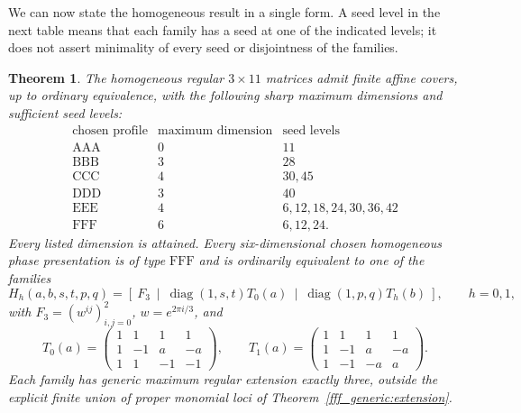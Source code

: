 \documentclass[11pt,a4paper]{article}
\newtheorem{theorem}{Theorem}[section]
\theoremstyle{plain}
\theoremstyle{definition}
\theoremstyle{plain}
\begin{document}
We can now state the homogeneous result in a single form. A seed level in the next table means that each family has a seed at one of the indicated levels; it does not assert minimality of every seed or disjointness of the families.

\par\addvspace{\medskipamount}\noindent
\begin{minipage}{\linewidth}
\begin{theorem}\label{report:homogeneous}
The homogeneous regular $3\times11$ matrices admit finite affine covers, up to ordinary equivalence, with the following sharp maximum dimensions and sufficient seed levels:
\[
\begin{array}{c|c|l}
\text{chosen profile}&\text{maximum dimension}&\text{seed levels}\\\hline
\mathrm{AAA}&0&11\\
\mathrm{BBB}&3&28\\
\mathrm{CCC}&4&30,45\\
\mathrm{DDD}&3&40\\
\mathrm{EEE}&4&6,12,18,24,30,36,42\\
\mathrm{FFF}&6&6,12,24.
\end{array}
\]
Every listed dimension is attained. Every six-dimensional chosen homogeneous phase presentation is of type $\mathrm{FFF}$ and is ordinarily equivalent to one of the families
\[
H_h(a,b,s,t,p,q)=
\left[\ F_3\ \middle|\ \operatorname{diag}(1,s,t)T_0(a)
\ \middle|\ \operatorname{diag}(1,p,q)T_h(b)\ \right],\qquad h=0,1,
\]
with $F_3=(w^{ij})_{i,j=0}^2$, $w=e^{2\pi i/3}$, and
\[
T_0(a)=\begin{pmatrix}1&1&1&1\\1&-1&a&-a\\1&1&-1&-1\end{pmatrix},\qquad
T_1(a)=\begin{pmatrix}1&1&1&1\\1&-1&a&-a\\1&-1&-a&a\end{pmatrix}.
\]
Each family has generic maximum regular extension exactly three, outside the explicit finite union of proper monomial loci of Theorem~\ref{fff_generic:extension}.
\end{theorem}
\end{minipage}
\par\addvspace{\medskipamount}
\end{document}
